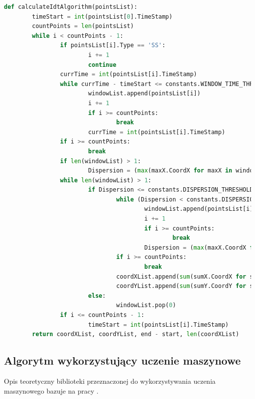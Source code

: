 \begin{lstlisting}[language=Python, caption=Kod algorytmu I-DT, label={lst:idt}]
def calculateIdtAlgorithm(pointsList):
        timeStart = int(pointsList[0].TimeStamp)
        countPoints = len(pointsList)
        while i < countPoints - 1:
                if pointsList[i].Type == 'SS':
                        i += 1
                        continue
                currTime = int(pointsList[i].TimeStamp)
                while currTime - timeStart <= constants.WINDOW_TIME_THRESHOLD:
                        windowList.append(pointsList[i])
                        i += 1
                        if i >= countPoints:
                                break
                        currTime = int(pointsList[i].TimeStamp)
                if i >= countPoints:
                        break
                if len(windowList) > 1:
                        Dispersion = (max(maxX.CoordX for maxX in windowList) - min(minX.CoordX for minX in windowList)) + (max(maxY.CoordY for maxY in windowList) - min(minY.CoordY for minY in windowList))
                while len(windowList) > 1:
                        if Dispersion <= constants.DISPERSION_THRESHOLD and len(windowList) > 1:
                                while (Dispersion < constants.DISPERSION_THRESHOLD):
                                        windowList.append(pointsList[i])
                                        i += 1
                                        if i >= countPoints:
                                                break
                                        Dispersion = (max(maxX.CoordX for maxX in windowList) - min(minX.CoordX for minX in windowList)) + (max(maxY.CoordY for maxY in windowList) - min(minY.CoordY for minY in windowList))
                                if i >= countPoints:
                                        break
                                coordXList.append(sum(sumX.CoordX for sumX in windowList) / len(windowList))
                                coordYList.append(sum(sumY.CoordY for sumY in windowList) / len(windowList))
                        else:
                                windowList.pop(0)
                if i <= countPoints - 1:
                        timeStart = int(pointsList[i].TimeStamp)
        return coordXList, coordYList, end - start, len(coordXList)
\end{lstlisting}
\subsection{Algorytm wykorzystujący uczenie maszynowe}
\label{ssec:machinelearningalg}
Opis teoretyczny biblioteki przeznaczonej do wykorzystywania uczenia maszynowego bazuje na pracy \cite{MLPython}.\par
